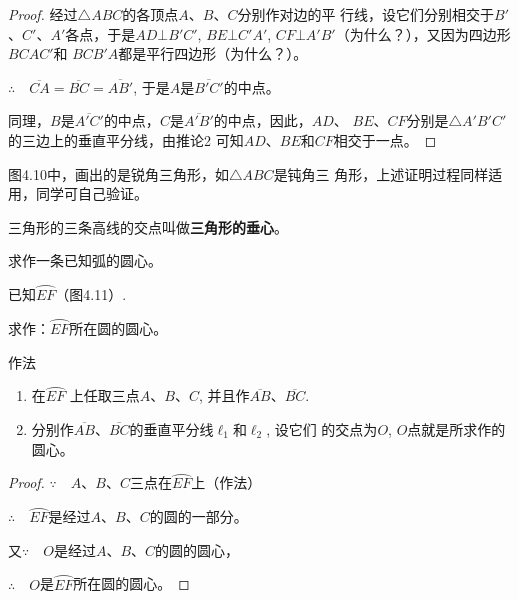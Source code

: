 \begin{proof}
    经过$\triangle ABC$的各顶点$A$、$B$、$C$分别作对边的平
行线，设它们分别相交于$B'$、$C'$、$A'$各点，于是$AD\bot B'C'$,
$BE\bot C'A'$, $CF\bot A'B'$（为什么？），又因为四边形$BCAC'$和
$BCB'A$都是平行四边形（为什么？）。

$\therefore\quad \overline{CA}=\overline{BC}=\overline{AB'}$, 于是$A$是$\overline{B'C'}$的中点。

同理，$B$是$\overline{A'C'}$的中点，$C$是$\overline{A'B'}$的中点，因此，$AD$、
$BE$、$CF$分别是$\triangle A'B'C'$的三边上的垂直平分线，由推论2
可知$AD$、$BE$和$CF$相交于一点。
\end{proof}


图4.10中，画出的是锐角三角形，如$\triangle ABC$是钝角三
角形，上述证明过程同样适用，同学可自己验证。

三角形的三条高线的交点叫做\textbf{三角形的垂心}。

\begin{example}
    求作一条已知弧的圆心。
\end{example}

已知$\wideparen{EF}$（图4.11）.

求作：$\wideparen{EF}$所在圆的圆心。

作法
\begin{enumerate}
    \item 在$\wideparen{EF}$
    上任取三点$A$、$B$、$C$, 并且作$\overline{AB}$、$\overline{BC}$.
    \item 分别作$\overline{AB}$、$\overline{BC}$的垂直平分线$\ell_1$和$\ell_2$, 设它们
    的交点为$O$, $O$点就是所求作的圆心。
\end{enumerate}

\begin{proof}
    $\because\quad A$、$B$、$C$三点在$\wideparen{EF}$上（作法）

$\therefore\quad \wideparen{EF}$是经过$A$、$B$、$C$的圆的一部分。

又$\because\quad O$是经过$A$、$B$、$C$的圆的圆心，

$\therefore\quad O$是$\wideparen{EF}$所在圆的圆心。
\end{proof}

